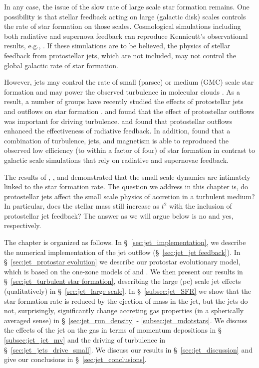 \documentclass[../dissertation.tex]{subfiles}
\begin{document}
In any case, the issue of the slow rate of large scale star formation remains.
One possibility is that stellar feedback acting on large (galactic disk) scales controls the rate of star formation on those scales.
Cosmological simulations including both radiative and supernova feedback can reproduce Kennicutt's observational results, e.g., \cite{2011MNRAS.417..950H,2013ApJ...770...25A,2014MNRAS.445..581H}. If these simulations are to be believed, the physics of stellar feedback from protostellar jets, which are not included, may not control the global galactic rate of star formation.

However, jets may control the rate of small (parsec) or medium (GMC) scale star formation and may power the observed turbulence in molecular clouds \citep{2007ApJ...659.1394M}.
As a result, a number of groups have recently studied the effects of protostellar jets and outflows on star formation \citep{2010ApJ...709...27W,2014MNRAS.439.3420M,2015MNRAS.450.4035F}.
\citet{2007ApJ...662..395N} and \citet{2011ApJ...740...36N} found that the effect of protostellar outflows was important for driving turbulence.  \citet{2011ApJ...740..107C} and \citet{2012ApJ...747...22H} found that protostellar outflows enhanced the effectiveness of radiative feedback.  In addition, \citet{2015MNRAS.450.4035F} found that a combination of turbulence, jets, and magnetism is able to reproduced the observed low efficiency (to within a factor of four) of star formation in contrast to galactic scale simulations that rely on radiative and supernovae feedback.

The results of \citet{2015ApJ...800...49L}, \citet{2015ApJ...804...44M}, and \citet{2017MNRAS.465.1316M} demonstrated that the small scale dynamics are intimately linked to the star formation rate. 
The question we address in this chapter is, do protostellar jets affect the small scale physics of accretion in a turbulent medium? 
In particular, does the stellar mass still increase as $t^2$ with the inclusion of protostellar jet feedback? 
The answer as we will argue below is no and yes, respectively.

The chapter is organized as follows.
In \S~\ref{sec:jet_implementation}, we describe the numerical implementation of the jet outflow (\S~\ref{sec:jet_jet feedback}).
In \S~\ref{sec:jet_protostar evolution} we describe our protostar evolutionary model, which is based on the one-zone models of \citet{2000ApJ...534..976N} and \citet{2009ApJ...703..131O}.
%
We then present our results in \S~\ref{sec:jet_turbulent star formation}, describing the large (pc) scale jet effects (qualitatively) in \S~\ref{sec:jet_large scale}.
In \S~\ref{subsec:jet_SFR} we show that the star formation rate is reduced by the ejection of mass in the jet, but the jets do not, surprisingly, significantly change accreting gas properties (in a spherically averaged sense) in \S ~\ref{sec:jet_run_density} - \ref{subsec:jet_mdotstars}.
We discuss the effects of the jet on the gas in terms of momentum depositions in  \S~ \ref{subsec:jet_jet_mv} and the driving of turbulence in \S~\ref{sec:jet_jets_drive_small}.
We discuss our results in \S~\ref{sec:jet_discussion} and give our conclusions in \S~\ref{sec:jet_conclusions}.
\end{document}
